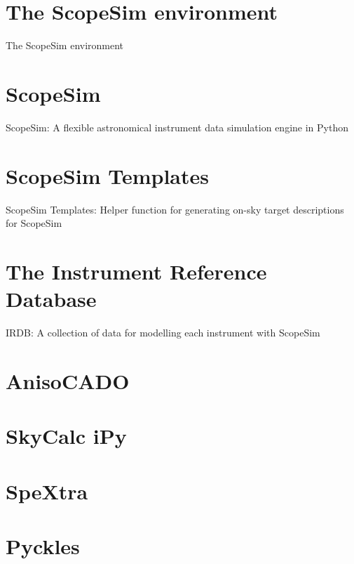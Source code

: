 \documentclass[a4paper,twoside,11pt]{article}
\begin{document}
\chapter{The ScopeSim environment}{The ScopeSim environment}


\chapter{ScopeSim}{ScopeSim: A flexible astronomical instrument data simulation engine in Python}


\chapter{ScopeSim Templates}{ScopeSim Templates: Helper function for generating on-sky target descriptions for ScopeSim}


\chapter{The Instrument Reference Database}{IRDB: A collection of data for modelling each instrument with ScopeSim}


\chapter{AnisoCADO}


\chapter{SkyCalc iPy}


\chapter{SpeXtra}


\chapter{Pyckles}

\end{document}
